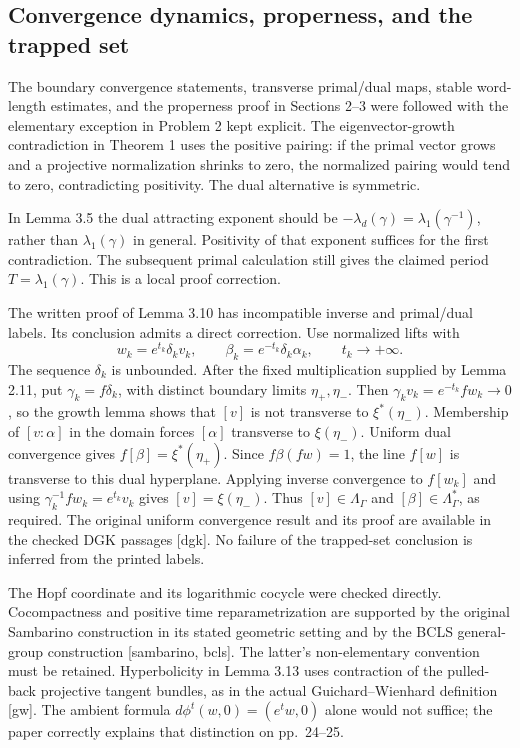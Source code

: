 \documentclass[10pt]{article}
\begin{document}
\subsection*{Convergence dynamics, properness, and the trapped set}
The boundary convergence statements, transverse primal/dual maps, stable word-length estimates, and the properness proof in Sections 2–3 were followed with the elementary exception in Problem 2 kept explicit. The eigenvector-growth contradiction in Theorem 1 uses the positive pairing: if the primal vector grows and a projective normalization shrinks to zero, the normalized pairing would tend to zero, contradicting positivity. The dual alternative is symmetric.\par
In Lemma 3.5 the dual attracting exponent should be \(-\lambda_d(\gamma)=\lambda_1(\gamma^{-1})\), rather than \(\lambda_1(\gamma)\) in general. Positivity of that exponent suffices for the first contradiction. The subsequent primal calculation still gives the claimed period \(T=\lambda_1(\gamma)\). This is a local proof correction.\par
The written proof of Lemma 3.10 has incompatible inverse and primal/dual labels. Its conclusion admits a direct correction. Use normalized lifts with \[w_k=e^{t_k}\delta_k v_k,\qquad
 \beta_k=e^{-t_k}\delta_k\alpha_k,
 \qquad t_k\longrightarrow+\infty.\] The sequence \(\delta_k\) is unbounded. After the fixed multiplication supplied by Lemma 2.11, put \(\gamma_k=f\delta_k\), with distinct boundary limits \(\eta_+,\eta_-\). Then \(\gamma_kv_k=e^{-t_k}fw_k\to0\), so the growth lemma shows that \([v]\) is not transverse to \(\xi^*(\eta_-)\). Membership of \([v:\alpha]\) in the domain forces \([\alpha]\) transverse to \(\xi(\eta_-)\). Uniform dual convergence gives \(f[\beta]=\xi^*(\eta_+)\). Since \(f\beta(fw)=1\), the line \(f[w]\) is transverse to this dual hyperplane. Applying inverse convergence to \(f[w_k]\) and using \(\gamma_k^{-1}fw_k=e^{t_k}v_k\) gives \([v]=\xi(\eta_-)\). Thus \([v]\in\Lambda_\Gamma\) and \([\beta]\in\Lambda_\Gamma^*\), as required. The original uniform convergence result and its proof are available in the checked DGK passages [dgk]. No failure of the trapped-set conclusion is inferred from the printed labels.\par
The Hopf coordinate and its logarithmic cocycle were checked directly. Cocompactness and positive time reparametrization are supported by the original Sambarino construction in its stated geometric setting and by the BCLS general-group construction [sambarino, bcls]. The latter’s non-elementary convention must be retained. Hyperbolicity in Lemma 3.13 uses contraction of the pulled-back projective tangent bundles, as in the actual Guichard–Wienhard definition [gw]. The ambient formula \(d\phi^t(w,0)=(e^tw,0)\) alone would not suffice; the paper correctly explains that distinction on pp. 24–25.\par
\end{document}
